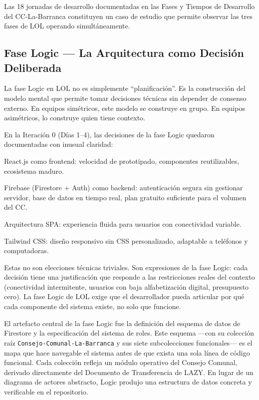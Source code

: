 \documentclass[14pt,a4paper,oneside]{extbook}
\begin{document}
Las 18 jornadas de desarrollo documentadas en las Fases y Tiempos de Desarrollo del CC-La-Barranca constituyen un caso de estudio que permite observar las tres fases de LOL operando simultáneamente.



\subsection{Fase Logic — La Arquitectura como Decisión Deliberada}

La fase Logic en LOL no es simplemente \enquote{planificación}. Es la construcción del modelo mental que permite tomar decisiones técnicas sin depender de consenso externo. En equipos simétricos, este modelo se construye en grupo. En equipos asimétricos, lo construye quien tiene contexto.

En la Iteración 0 (Días 1--4), las decisiones de la fase Logic quedaron documentadas con inusual claridad:

React.js como frontend: velocidad de prototipado, componentes reutilizables, ecosistema maduro.

Firebase (Firestore + Auth) como backend: autenticación segura sin gestionar servidor, base de datos en tiempo real, plan gratuito suficiente para el volumen del CC.

Arquitectura SPA: experiencia fluida para usuarios con conectividad variable.

Tailwind CSS: diseño responsivo sin CSS personalizado, adaptable a teléfonos y computadoras.

Estas no son elecciones técnicas triviales. Son expresiones de la fase Logic: cada decisión tiene una justificación que responde a las restricciones reales del contexto (conectividad intermitente, usuarios con baja alfabetización digital, presupuesto cero). La fase Logic de LOL exige que el desarrollador pueda articular por qué cada componente del sistema existe, no solo que funcione.

El artefacto central de la fase Logic fue la definición del esquema de datos de Firestore y la especificación del sistema de roles. Este esquema —con su colección raíz \texttt{Consejo-Comunal-La-Barranca} y sus siete subcolecciones funcionales— es el mapa que hace navegable el sistema antes de que exista una sola línea de código funcional. Cada colección refleja un módulo operativo del Consejo Comunal, derivado directamente del Documento de Transferencia de LAZY. En lugar de un diagrama de actores abstracto, Logic produjo una estructura de datos concreta y verificable en el repositorio.
\end{document}
